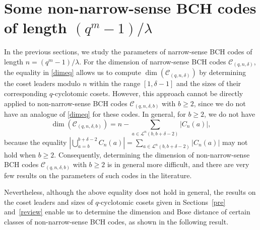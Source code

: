 \documentclass[journal,onecolumn]{IEEEtran}
\begin{document}
\section{Some non-narrow-sense BCH codes of length  \texorpdfstring{$ (q^m-1)/\lambda $} \ }\label{non}
\linenumbers
In the previous sections, we study the parameters of narrow-sense BCH codes of length $n=(q^m-1)/\lambda$. For the dimension of narrow-sense 
BCH codes $\mathcal{C}_{(q,n,\delta)}$, the
equality in \eqref{dimeq} allows us to compute $\dim(\mathcal{C}_{(q,n,\delta)})$ by 
determining the coset leaders modulo $n$ within the range $[1,\delta-1]$ and the sizes of their corresponding $q$-cyclotomic cosets.
However, this approach cannot be directly applied to non-narrow-sense BCH codes $\mathcal{C}_{(q,n,\delta,b)}$ with $b \ge 2$, since we do not have an analogue of \eqref{dimeq} for these codes. In general, for $b\geq 2$, we do not have 
\begin{equation*}
   \dim(\mathcal{C}_{(q,n,\delta,b)}) 
   =  n - \sum_{a \in \mathcal{L}^n(b,b+\delta-2)} |C_n(a)|,
\end{equation*}
because the equality
$
   \left|     \bigcup\limits_{a=b}^{b+\delta-2} C_n(a)
   \right|
   =
   \sum\limits_{a \in \mathcal{L}^n(b,b+\delta-2)} |C_n(a)|
$
may not hold  when $b \ge 2$. 
Consequently, determining the dimension of non-narrow-sense BCH codes $\mathcal{C}_{(q,n,\delta,b)}$ with $b \ge 2$ is in general more difficult, and there are very few results on the parameters of such codes in the literature.

Nevertheless, although the above equality does not hold in general, the results on the coset leaders  and sizes of  $q$-cyclotomic cosets given  in Sections~\ref{pre} and~\ref{review} enable us to determine the dimension and Bose distance of certain classes of non-narrow-sense BCH codes, as shown in the following result.
\end{document}
